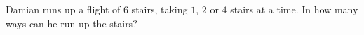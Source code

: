 Damian runs up a flight of $6$ stairs, taking $1$, $2$ or $4$ stairs at a time. In how many ways can he run up the stairs?
